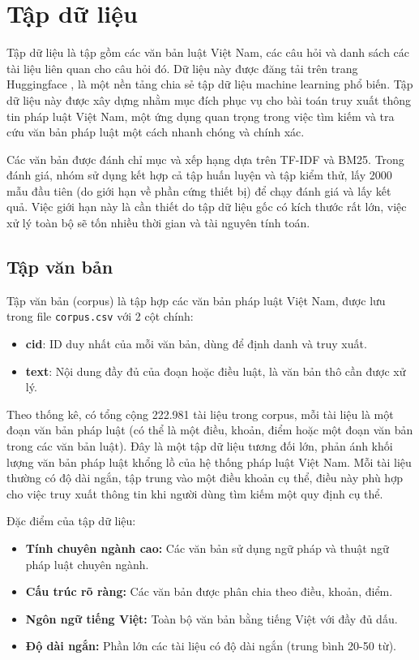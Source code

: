 \documentclass[../BTL.tex]{subfiles}
\begin{document}
\section{Tập dữ liệu}
Tập dữ liệu là tập gồm các văn bản luật Việt Nam, các câu hỏi và danh sách các tài liệu liên quan cho câu hỏi đó. Dữ liệu này được đăng tải trên trang Huggingface \cite{dataset}, là một nền tảng chia sẻ tập dữ liệu machine learning phổ biến. Tập dữ liệu này được xây dựng nhằm mục đích phục vụ cho bài toán truy xuất thông tin pháp luật Việt Nam, một ứng dụng quan trọng trong việc tìm kiếm và tra cứu văn bản pháp luật một cách nhanh chóng và chính xác.

Các văn bản được đánh chỉ mục và xếp hạng dựa trên TF-IDF và BM25. Trong đánh giá, nhóm sử dụng kết hợp cả tập huấn luyện và tập kiểm thử, lấy 2000 mẫu đầu tiên (do giới hạn về phần cứng thiết bị) để chạy đánh giá và lấy kết quả. Việc giới hạn này là cần thiết do tập dữ liệu gốc có kích thước rất lớn, việc xử lý toàn bộ sẽ tốn nhiều thời gian và tài nguyên tính toán.

\subsection{Tập văn bản}
Tập văn bản (corpus) là tập hợp các văn bản pháp luật Việt Nam, được lưu trong file \texttt{corpus.csv} với 2 cột chính:
\begin{itemize}
    \item \textbf{cid}: ID duy nhất của mỗi văn bản, dùng để định danh và truy xuất.
    \item \textbf{text}: Nội dung đầy đủ của đoạn hoặc điều luật, là văn bản thô cần được xử lý.
\end{itemize}

Theo thống kê, có tổng cộng 222.981 tài liệu trong corpus, mỗi tài liệu là một đoạn văn bản pháp luật (có thể là một điều, khoản, điểm hoặc một đoạn văn bản trong các văn bản luật). Đây là một tập dữ liệu tương đối lớn, phản ánh khối lượng văn bản pháp luật khổng lồ của hệ thống pháp luật Việt Nam. Mỗi tài liệu thường có độ dài ngắn, tập trung vào một điều khoản cụ thể, điều này phù hợp cho việc truy xuất thông tin khi người dùng tìm kiếm một quy định cụ thể.

Đặc điểm của tập dữ liệu:
\begin{itemize}
    \item \textbf{Tính chuyên ngành cao:} Các văn bản sử dụng ngữ pháp và thuật ngữ pháp luật chuyên ngành.
    \item \textbf{Cấu trúc rõ ràng:} Các văn bản được phân chia theo điều, khoản, điểm.
    \item \textbf{Ngôn ngữ tiếng Việt:} Toàn bộ văn bản bằng tiếng Việt với đầy đủ dấu.
    \item \textbf{Độ dài ngắn:} Phần lớn các tài liệu có độ dài ngắn (trung bình 20-50 từ).
\end{itemize}
\end{document}
